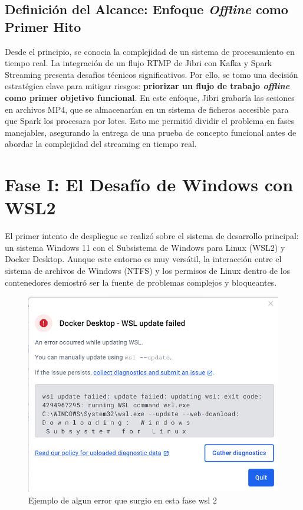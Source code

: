 \subsection{Definición del Alcance: Enfoque \textit{Offline} como Primer Hito}
Desde el principio, se conocia la complejidad de un sistema de procesamiento en tiempo real. La integración de un flujo RTMP de Jibri con Kafka y Spark Streaming presenta desafíos técnicos significativos. Por ello, se tomo una decisión estratégica clave para mitigar riesgos: \textbf{priorizar un flujo de trabajo \textit{offline} como primer objetivo funcional}. En este enfoque, Jibri grabaría las sesiones en archivos MP4, que se almacenarían en un sistema de ficheros accesible para que Spark los procesara por lotes. Esto me permitió dividir el problema en fases manejables, asegurando la entrega de una prueba de concepto funcional antes de abordar la complejidad del streaming en tiempo real.

\section{Fase I: El Desafío de Windows con WSL2}
\label{sec:desarrollo_acto1}
El primer intento de despliegue se realizó sobre el sistema de desarrollo principal: un sistema Windows 11 con el Subsistema de Windows para Linux (WSL2) y Docker Desktop. Aunque este entorno es muy versátil, la interacción entre el sistema de archivos de Windows (NTFS) y los permisos de Linux dentro de los contenedores demostró ser la fuente de problemas complejos y bloqueantes.

\begin{figure}[H]
    \centering
    \includegraphics[width=\textwidth]{img/wsl2error.png}
    \caption{Ejemplo de algun error que surgio en esta fase wsl 2}
    \label{fig:Error WSL2}
\end{figure}

